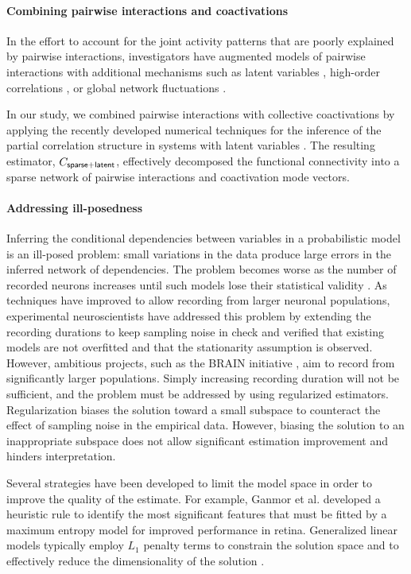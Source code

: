 \documentclass[10pt]{article}
\begin{document}
\paragraph{Combining pairwise interactions and coactivations}
In the effort to account for the joint activity patterns that are poorly explained by pairwise interactions, investigators have augmented models of pairwise interactions with additional mechanisms such as latent variables \cite{Koster:2013},  high-order correlations \cite{Ganmor:2011}, or global network fluctuations \cite{Tkacik:2013}.

In our study, we combined pairwise interactions with collective coactivations by applying the recently developed numerical techniques for the inference of the partial correlation structure in systems with latent variables \cite{Chandrasekaran:2010, Ma:2013}.  The resulting estimator, $C_{\sf sparse+latent}$, effectively decomposed the functional connectivity into a sparse network of pairwise interactions and coactivation mode vectors.

\paragraph{Addressing ill-posedness}
Inferring the conditional dependencies between variables in a probabilistic model is an ill-posed problem: small variations in the data produce large errors in the inferred network of dependencies. The problem becomes worse as the number of  recorded neurons increases until such models lose their statistical validity \cite{Roudi:2009}.  As techniques have improved to allow recording from larger neuronal populations, experimental neuroscientists have addressed this problem by extending the recording durations to keep sampling noise in check and verified that existing models are not overfitted and that the stationarity assumption is observed\cite{Tkacik:2013}. However, ambitious projects, such as the BRAIN initiative  \cite{Alivisatos:2013}, aim to record from significantly larger populations. Simply increasing recording duration will not be sufficient, and the problem must be addressed by using regularized estimators. Regularization biases the solution toward a small subspace to counteract the effect of  sampling noise in the empirical data. However, biasing the solution to an inappropriate subspace does not allow significant estimation improvement and hinders interpretation.

Several strategies have been developed to limit the model space in order to improve the quality of the estimate. For example, Ganmor et al. \cite{Ganmor:2011} developed a heuristic rule to identify the most significant features that must be fitted by a maximum entropy model for improved performance in retina. Generalized linear models typically employ $L_1$ penalty terms to constrain the solution space and to effectively reduce the dimensionality of the solution \cite{Pillow:2008}.  
\end{document}
